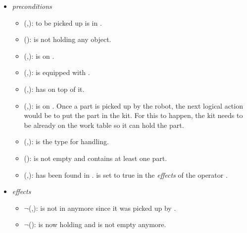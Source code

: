 \begin{enumerate}
\begin{itemize}
 \item \textit{preconditions}
 \begin{itemize}
 \item {}(,):  to be picked up is in .
 \item {}():  is not holding any object.
 \item {}(,):  is on .
 \item {}(,):  is equipped with .
 \item {}(,):  has  on top of it.
 \item {}(,):  is on . Once a part is picked up by the robot, the next logical action would be to put the part in the kit. For this to happen, the kit needs to be already on the work table so it can hold the part.
 \item {}(,):  is the type for  handling.
 \item {}():  is not empty and contains at least one part.
 \item {}(,):  has been found in .  is set to true in the \textit{effects} of the operator .
 \end{itemize}
\item \textit{effects}
 \begin{itemize}
 \item $\neg$(,):  is not in  anymore since it was picked up by .
 \item $\neg$():  is now holding  and is not empty anymore.

\end{itemize}
\end{itemize}
\end{enumerate}
